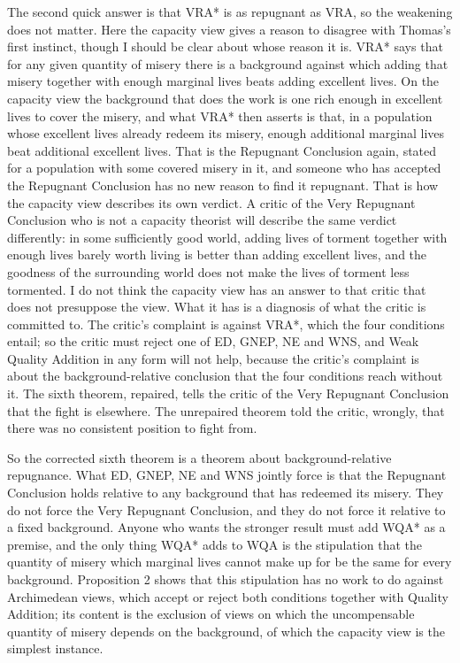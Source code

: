 \documentclass[
  11pt,
  letterpaper,
  DIV=11,
  numbers=noendperiod,
  twoside]{scrartcl}
\begin{document}
The second quick answer is that VRA* is as repugnant as VRA, so the
weakening does not matter. Here the capacity view gives a reason to
disagree with Thomas's first instinct, though I should be clear about
whose reason it is. VRA* says that for any given quantity of misery
there is a background against which adding that misery together with
enough marginal lives beats adding excellent lives. On the capacity view
the background that does the work is one rich enough in excellent lives
to cover the misery, and what VRA* then asserts is that, in a population
whose excellent lives already redeem its misery, enough additional
marginal lives beat additional excellent lives. That is the Repugnant
Conclusion again, stated for a population with some covered misery in
it, and someone who has accepted the Repugnant Conclusion has no new
reason to find it repugnant. That is how the capacity view describes its
own verdict. A critic of the Very Repugnant Conclusion who is not a
capacity theorist will describe the same verdict differently: in some
sufficiently good world, adding lives of torment together with enough
lives barely worth living is better than adding excellent lives, and the
goodness of the surrounding world does not make the lives of torment
less tormented. I do not think the capacity view has an answer to that
critic that does not presuppose the view. What it has is a diagnosis of
what the critic is committed to. The critic's complaint is against VRA*,
which the four conditions entail; so the critic must reject one of ED,
GNEP, NE and WNS, and Weak Quality Addition in any form will not help,
because the critic's complaint is about the background-relative
conclusion that the four conditions reach without it. The sixth theorem,
repaired, tells the critic of the Very Repugnant Conclusion that the
fight is elsewhere. The unrepaired theorem told the critic, wrongly,
that there was no consistent position to fight from.

So the corrected sixth theorem is a theorem about background-relative
repugnance. What ED, GNEP, NE and WNS jointly force is that the
Repugnant Conclusion holds relative to any background that has redeemed
its misery. They do not force the Very Repugnant Conclusion, and they do
not force it relative to a fixed background. Anyone who wants the
stronger result must add WQA* as a premise, and the only thing WQA* adds
to WQA is the stipulation that the quantity of misery which marginal
lives cannot make up for be the same for every background. Proposition 2
shows that this stipulation has no work to do against Archimedean views,
which accept or reject both conditions together with Quality Addition;
its content is the exclusion of views on which the uncompensable
quantity of misery depends on the background, of which the capacity view
is the simplest instance.
\end{document}
